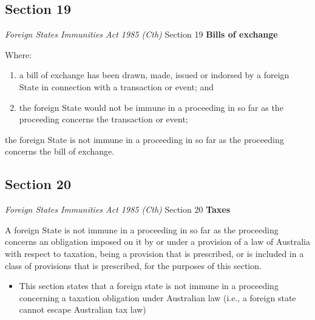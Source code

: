 \subsection{Section 19}
\begin{statutedetails}{\textit{Foreign States Immunities Act 1985 (Cth)} Section 19}
    \flushleft
    \textbf{Bills of exchange}

    \vspace{\baselineskip}

    Where:
    \begin{enumerate}[label=(\alph*)]
        \item a bill of exchange has been drawn, made, issued or indorsed by a foreign State in connection with a transaction or event; and
        \item the foreign State would not be immune in a proceeding in so far as the proceeding concerns the transaction or event;
    \end{enumerate}
    the foreign State is not immune in a proceeding in so far as the proceeding concerns the bill of exchange.
\end{statutedetails}

\subsection{Section 20}
\begin{statutedetails}{\textit{Foreign States Immunities Act 1985 (Cth)} Section 20}
    \flushleft
    \textbf{Taxes}

    \vspace{\baselineskip}

    A foreign State is not immune in a proceeding in so far as the proceeding concerns an obligation imposed on it by or under a provision of a law of Australia with respect to taxation, being a provision that is prescribed, or is included in a class of provisions that is prescribed, for the purposes of this section.
\end{statutedetails}

\begin{itemize}
    \item This section states that a foreign state is not immune in a proceeding concerning a taxation obligation under Australian law (i.e., a foreign state cannot escape Australian tax law)
\end{itemize}


